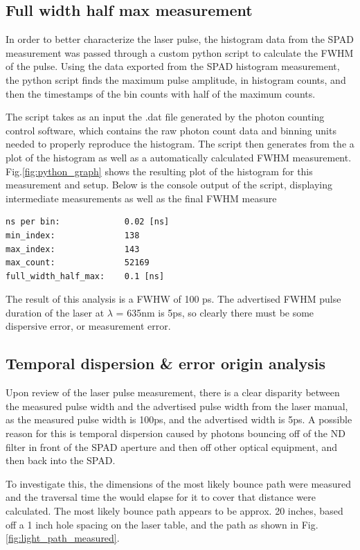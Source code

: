 \documentclass[a4paper]{article}
\begin{document}
\subsection{Full width half max measurement}

In order to better characterize the laser pulse, the histogram data from the SPAD measurement was passed through a custom python script to calculate the FWHM of the pulse.
Using the data exported from the SPAD histogram measurement, the python script finds the maximum pulse amplitude, in histogram counts, and then the timestamps of the bin counts with half of the maximum counts.

The script takes as an input the .dat file generated by the photon counting control software, which contains the raw photon count data and binning units needed to properly reproduce the histogram. The script then generates from the a plot of the histogram as well as a automatically calculated FWHM measurement. Fig.\ref{fig:python_graph} shows the resulting plot of the histogram for this measurement and setup. Below is the console output of the script, displaying intermediate measurements as well as the final FWHM measure

\begin{verbatim}
ns per bin:             0.02 [ns]
min_index:              138
max_index:              143
max_count:              52169
full_width_half_max:    0.1 [ns]
\end{verbatim}

The result of this analysis is a FWHW of 100 ps. The advertised FWHM pulse duration of the laser at \(\lambda\) = 635nm is 5ps, so clearly there must be some dispersive error, or measurement error.

\subsection{Temporal dispersion \& error origin analysis}

Upon review of the laser pulse measurement, there is a clear disparity between the measured pulse width and the advertised pulse width from the laser manual, as the measured pulse width is 100ps, and the advertised width is 5ps. A possible reason for this is temporal dispersion caused by photons bouncing off of the ND filter in front of the SPAD aperture and then off other optical equipment, and then back into the SPAD.

To investigate this, the dimensions of the most likely bounce path were measured and the traversal time the would elapse for it to cover that distance were calculated.
The most likely bounce path appears to be approx. 20 inches, based off a 1 inch hole spacing on the laser table, and the path as shown in Fig.\ref{fig:light_path_measured}.
\end{document}
